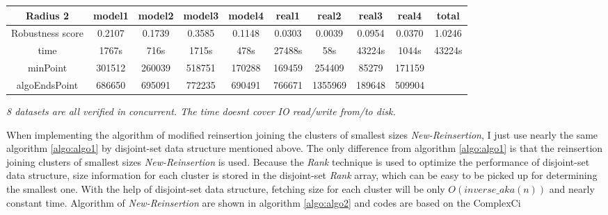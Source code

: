 \documentclass{article}
\begin{document}
\begin{table}[!htbp]
\begin{adjustwidth}{-1cm}{}
\begin{threeparttable}
\begin{tabular}{|c|c|c|c|c|c|c|c|c|c|}
				\textbf{Radius 2} & \textbf{model1} & \textbf{model2} & \textbf{model3} & \textbf{model4} & \textbf{real1} & \textbf{real2} & \textbf{real3} & \textbf{real4} & \textbf{total} \\ \hline
				Robustness score                 & 0.2107    & 0.1739    & 0.3585    & 0.1148    & 0.0303    & 0.0039    & 0.0954    & 0.0370    & 1.0246    \\ \hline
				
				time                             & 1767s     & 716s      & 1715s     & 478s      & 27488s    & 58s       & 43224s    & 1044s     & 43224s    \\ \hline
				
				minPoint                         & 301512          & 260039          & 518751          & 170288          & 169459         & 254409         & 85279          & 171159         &                \\ \hline
				algoEndsPoint                    & 686650          & 695091          & 772235          & 690491          & 766671         & 1355969        & 189648         & 509904         &                \\ \hline
				
			\end{tabular}
			\begin{tablenotes}
				\small
				\item\textit{ 8 datasets are all verified in concurrent. The time doesn\textquotesingle t cover IO read/write from/to disk.}
			\end{tablenotes}			
		\end{threeparttable}
	\end{adjustwidth}	
	\end{table}
	 
	 
	 When implementing the algorithm of modified reinsertion joining the clusters of smallest sizes \textit{New-Reinsertion}, I just use nearly the same algorithm \ref{algo:algo1} by disjoint-set data structure mentioned above. The only difference from algorithm \ref{algo:algo1} is that the reinsertion joining clusters of smallest sizes \textit{New-Reinsertion} is used. Because the \textit{Rank} technique is used to optimize the performance of disjoint-set data structure, size information for each cluster is stored in the disjoint-set \textit{Rank} array, which can be easy to be picked up for determining the smallest one. With the help of disjoint-set data structure, fetching size for each cluster will be only $O(inverse\_aka(n))$ and nearly constant time. Algorithm of \textit{New-Reinsertion} are shown in algorithm \ref{algo:algo2} and codes are based on the ComplexCi
	 
\end{document}
